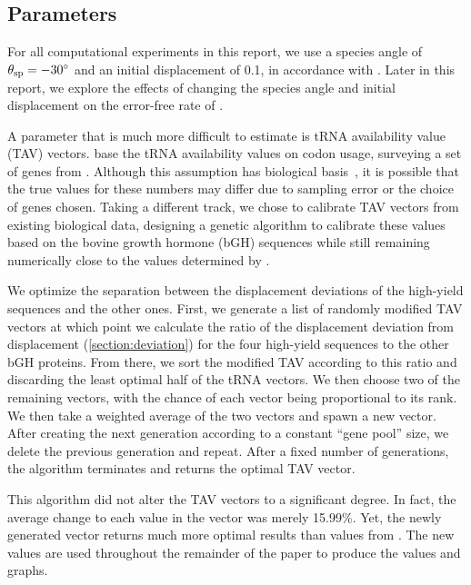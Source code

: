 \documentclass[12pt]{article}
\numberwithin{equation}{section}
\begin{document}
\subsection{Parameters}
\label{section:parameters}
For all computational experiments in this report, we use a species
angle of $\theta_{\rm{sp}} = -30^\circ$ and an initial displacement of 0.1,
in accordance with \citet{lalit:embs}.  Later in this report, we explore
the effects of changing the species angle and initial displacement on the
error-free rate of \prfB.

A parameter that is much more difficult to estimate
is tRNA availability value (TAV) vectors.
\citeauthor{lalit:embs} base the tRNA availability values on codon usage, 
surveying a set of genes from \ecoli.
Although this assumption has biological basis~\cite{ikemura}, 
it is possible that the true values for these numbers may differ 
due to sampling error or the choice of genes chosen.
Taking a different track, we chose to calibrate TAV vectors from
existing biological data, designing a genetic algorithm to calibrate
these values based on the bovine growth hormone (bGH) sequences
while still remaining numerically close to the values determined by \citeauthor{lalit:embs}.

We optimize the separation between the displacement deviations of the 
high-yield sequences and the other ones.  
First, we generate a list of randomly modified TAV vectors at which
point we calculate the ratio of the displacement deviation from
displacement (\autoref{section:deviation}) for the four high-yield 
sequences to the other bGH proteins. From there, we sort the 
modified TAV according to this ratio and discarding the least 
optimal half of the tRNA vectors. We then choose two of the 
remaining vectors, with the chance of each vector being proportional
 to its rank.  We then take a weighted average of the two vectors 
 and spawn a new vector.  After creating the next generation according 
 to a constant ``gene pool'' size, we delete the previous generation 
 and repeat. After a fixed number of generations, the algorithm 
 terminates and returns the optimal TAV vector.

This algorithm did not alter the TAV vectors to a significant degree.
In fact, the average change to each value in the vector was merely
15.99\%.  Yet, the newly generated vector returns much more optimal
results than values from \citeauthor{lalit:embs}.  The new values
are used throughout the remainder of the paper to produce the 
values and graphs.
\end{document}
